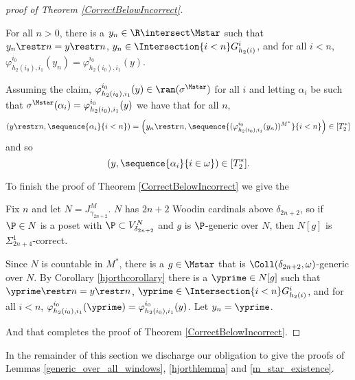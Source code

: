 \documentclass[oneside,12pt]{amsart}
\begin{document}
\begin{proof}[proof of Theorem \ref{CorrectBelowIncorrect}]
\begin{claim}
For all $n>0$, there is a $y_n\in \R\intersect\Mstar$ such that $y_n\restr n = y \restr n$,
$y_n \in  \Intersection{i<n} G^i_{h_2(i)}$,
and for all $i < n$, $\varphi^{i_0}_{h_2(i_0),i_1}(y_n) = \varphi^{i_0}_{h_2(i_0),i_1}(y)$.
\end{claim}

Assuming the claim, $\varphi^{i_0}_{h_2(i_0),i_1}(y)\in\ran(\sigma^{\Mstar})$ for all $i$
and letting $\alpha_i$ be such that $\sigma^{\Mstar}(\alpha_i)=\varphi^{i_0}_{h_2(i_0),i_1}(y)$
we have that for all $n$,
$$\left(y\restr n, \sequence{\alpha_i}{i<n} \right)=
\left(y_n\restr n, \sequence{(\varphi^{i_0}_{h_2(i_0),i_1}(y_n))^{M^*}}{i<n} \right)\in[T^*_2]$$
and so
$$\left(y, \sequence{\alpha_i}{i\in\omega} \right)\in[T^*_2].$$

To finish the proof of Theorem \ref{CorrectBelowIncorrect} we give the

\begin{subproof}
Fix $n$ and let $N=J^M_{\gamma_{2n+2}}$. $N$ has $2n+2$ Woodin cardinals above $\delta_{2n+2}$,
so if $\P\in N$ is a poset with $\P\subset V^N_{\delta_{2n+2}}$ and $g$ is $\P$-generic over $N$, then $N[g]$
is $\Sigma^1_{2n+4}$-correct.

Since $N$ is countable in $M^*$, there is a $g\in\Mstar$ that is
$\Coll(\delta_{2n+2},\omega)$-generic over $N$. By Corollary \ref{hjorthcorollary}
there is a $\yprime\in N[g]$ such that
$\yprime\restr n = y \restr n$,
$\yprime \in  \Intersection{i<n} G^i_{h_2(i)}$,
and for all $i < n$, $\varphi^{i_0}_{h_2(i_0),i_1}(\yprime) = \varphi^{i_0}_{h_2(i_0),i_1}(y)$.
Let $y_n=\yprime$.

\end{subproof}

And that completes the proof of Theorem \ref{CorrectBelowIncorrect}.

\end{proof}

In the remainder of this section we discharge our obligation to give the proofs of
Lemmas \ref{generic_over_all_windows}, \ref{hjorthlemma} and
\ref{m_star_existence}.
\end{document}
